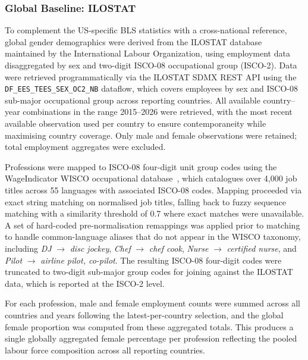 \subsubsection{Global Baseline: ILOSTAT}

To complement the US-specific BLS statistics with a cross-national reference, global
gender demographics were derived from the ILOSTAT database maintained by the
International Labour Organization, using employment data disaggregated by sex and
two-digit ISCO-08 occupational group (ISCO-2). Data were retrieved programmatically
via the ILOSTAT SDMX REST API using the \texttt{DF\_EES\_TEES\_SEX\_OC2\_NB}
dataflow, which covers employees by sex and ISCO-08 sub-major occupational group across
reporting countries. All available country--year combinations in the range 2015--2026
were retrieved, with the most recent available observation used per country to ensure
contemporaneity while maximising country coverage. Only male and female observations
were retained; total employment aggregates were excluded.

Professions were mapped to ISCO-08 four-digit unit group codes using the WageIndicator
WISCO occupational database~\cite{WageIndicator_WISCO}, which catalogues over 4,000 job
titles across 55 languages with associated ISCO-08 codes. Mapping proceeded via exact
string matching on normalised job titles, falling back to fuzzy sequence matching with a
similarity threshold of 0.7 where exact matches were unavailable. A set of hard-coded
pre-normalisation remappings was applied prior to matching to handle common-language
aliases that do not appear in the WISCO taxonomy, including \textit{DJ}
$\rightarrow$ \textit{disc jockey}, \textit{Chef} $\rightarrow$ \textit{chef cook},
\textit{Nurse} $\rightarrow$ \textit{certified nurse}, and \textit{Pilot}
$\rightarrow$ \textit{airline pilot, co-pilot}. The resulting ISCO-08 four-digit codes
were truncated to two-digit sub-major group codes for joining against the ILOSTAT data,
which is reported at the ISCO-2 level.

For each profession, male and female employment counts were summed across all countries
and years following the latest-per-country selection, and the global female proportion
was computed from these aggregated totals. This produces a single globally aggregated
female percentage per profession reflecting the pooled labour force composition across
all reporting countries.

